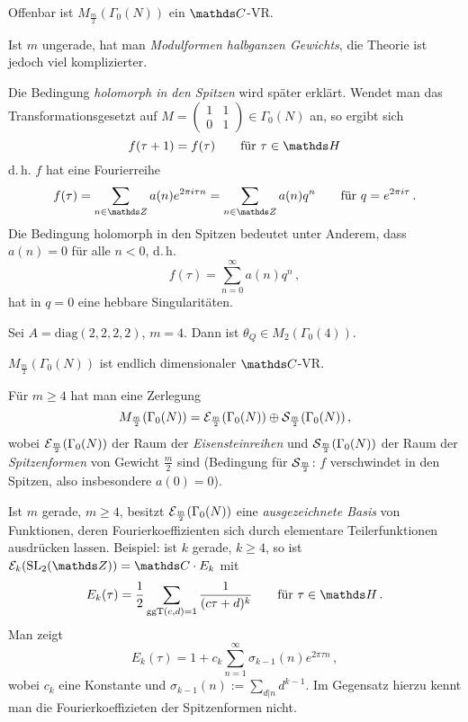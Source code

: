 \begin{beme-list}
\item Offenbar ist $M_{\frac{m}{2}}(\Gamma_0(N))$ ein $\CC$-VR.
\item Ist $m$ ungerade, hat man \emph{Modulformen halbganzen Gewichts}, die Theorie ist jedoch viel komplizierter.
\item Die Bedingung \emph{holomorph in den Spitzen} wird später erklärt.
Wendet man das Transformationsgesetzt auf $M = (\begin{smallmatrix}1&1\\0&1\end{smallmatrix}) \in \Gamma_0(N)$ an, so ergibt sich
\[
	f(\tau + 1) = f(\tau)
	\qquad \text{für } \tau\in\HH
\]
d.\,h. $f$ hat eine Fourierreihe
\[
	f(\tau) = \sum_{n\in\ZZ} a(n)e^{2\pi i \tau n} = \sum_{n\in\ZZ} a(n)q^n
	\qquad \text{für } q = e^{2\pi i \tau}
	\,.
\]
Die Bedingung holomorph in den Spitzen bedeutet unter Anderem, dass $a(n) = 0$ für alle $n < 0$, d.\,h.
\[
	f(\tau)
	= \sum_{n=0}^\infty a(n)q^n
	\,,
\]
hat in $q=0$ eine hebbare Singularitäten.
\end{beme-list}
\begin{bsp-list}
\item Sei $A = \mathrm{diag}(2,2,2,2)$, $m=4$.
Dann ist $\theta_Q \in M_2(\Gamma_0(4))$.
\item $M_{\frac{m}{2}}(\Gamma_0(N))$ ist endlich dimensionaler $\CC$-VR.
\item Für $m \geq 4$ hat man eine Zerlegung
\[
	M_{\frac{m}{2}}(\Gamma_0(N))
	= \mathcal{E}_{\frac{m}{2}}(\Gamma_0(N)) \oplus \mathcal{S}_{\frac{m}{2}}(\Gamma_0(N))
	\,,
\]
wobei $\mathcal{E}_{\frac{m}{2}}(\Gamma_0(N))$ der Raum der \emph{Eisensteinreihen} und $\mathcal{S}_{\frac{m}{2}}(\Gamma_0(N))$ der Raum der \emph{Spitzenformen} von Gewicht $\frac{m}{2}$ sind
(Bedingung für $\mathcal{S}_{\frac{m}{2}}$: $f$ verschwindet in den Spitzen, also insbesondere $a(0) = 0$).

Ist $m$ gerade, $m\geq 4$, besitzt $\mathcal{E}_{\frac{m}{2}}(\Gamma_0(N))$ eine \emph{ausgezeichnete Basis} von Funktionen, deren Fourierkoeffizienten sich durch elementare Teilerfunktionen ausdrücken lassen.
Beispiel: ist $k$ gerade, $k \geq 4$, so ist $\E_k(\SL_2(\ZZ)) = \CC\cdot E_k$ mit
\[
	E_k(\tau)
	= \frac{1}{2} \sum_{\ggt(c,d) = 1} \frac{1}{(c\tau + d)^k}
	\qquad \text{für } \tau\in\HH
	\,.
\]
Man zeigt
\[
	E_k(\tau) = 1 + c_k \sum_{n=1}^\infty \sigma_{k-1}(n)e^{2\pi \tau n}
	\,,
\]
wobei $c_k$ eine Konstante und $\sigma_{k-1}(n) := \sum_{d|n}d^{k-1}$.
Im Gegensatz hierzu kennt man die Fourierkoeffizieten der Spitzenformen nicht.
\end{bsp-list}

